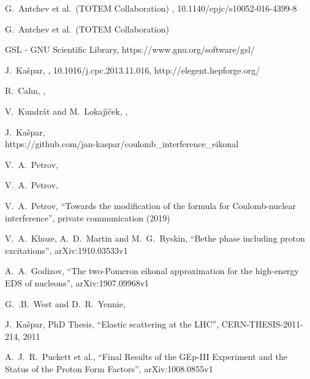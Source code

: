 \documentclass[pdftex,twocolumn,epjc3]{svjour3}
\begin{document}
\begin{thebibliography}{9}

	G.~Antchev et al.~(TOTEM Collaboration)
	,
	10.1140/epjc/s10052-016-4399-8

	G.~Antchev et al.~(TOTEM Collaboration)

	GSL - GNU Scientific Library,
	https://www.gnu.org/software/gsl/

	J.~Ka\v{s}par,
	,
	10.1016/j.cpc.2013.11.016,
	http://elegent.hepforge.org/

	R.~Cahn,
	,

	V.~Kundr\'{a}t and M.~Lokaj\'{\i}\v{c}ek,
	,

	J.~Ka\v{s}par,\\
	https://github.com/jan-kaspar/coulomb\_interference\_eikonal

	V.~A.~Petrov,

	V.~A.~Petrov,

	V.~A.~Petrov,
	``Towards the modification of the formula for Coulomb-nuclear interference'',
	private communication (2019)

	V.~A.~Khoze, A.~D.~Martin and M.~G.~Ryskin,
	``Bethe phase including proton excitations'',
	arXiv:1910.03533v1

	A.~A.~Godizov,
	``The two-Pomeron eikonal approximation for the high-energy EDS of nucleons'',
	arXiv:1907.09968v1

	G.~.B.~West and D.~R.~Yennie,
	
	J.~Ka\v{s}par,
	PhD Thesis,
	``Elastic scattering at the LHC'',
	CERN-THESIS-2011-214,
	2011

	A.~J.~R.~Puckett et al.,
	``Final Results of the GEp-III Experiment and the Status of the Proton Form Factors'',
	arXiv:1008.0855v1

\end{thebibliography}
\end{document}
